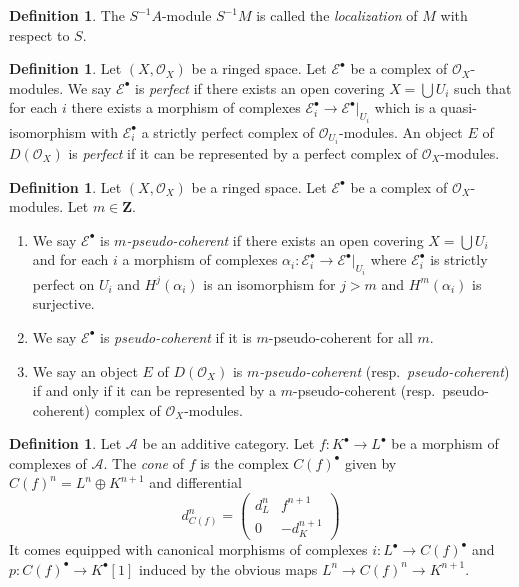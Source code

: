 \documentclass{amsart}
\theoremstyle{plain}
\theoremstyle{definition}
\newtheorem{definition}[subsection]{Definition}
\theoremstyle{remark}
\numberwithin{equation}{subsection}
\begin{document}
\begin{definition}
\label{algebra-definition-localization-module}
The $S^{-1}A$-module $S^{-1}M$ is called the {\it localization} of $M$
with respect to $S$.
\end{definition}

\begin{definition}
\label{cohomology-definition-perfect}
Let $(X, \mathcal{O}_X)$ be a ringed space.
Let $\mathcal{E}^\bullet$ be a complex of $\mathcal{O}_X$-modules.
We say $\mathcal{E}^\bullet$ is {\it perfect} if there exists
an open covering $X = \bigcup U_i$ such that for each $i$
there exists a morphism of complexes
$\mathcal{E}_i^\bullet \to \mathcal{E}^\bullet|_{U_i}$
which is a quasi-isomorphism with $\mathcal{E}_i^\bullet$
a strictly perfect complex of $\mathcal{O}_{U_i}$-modules.
An object $E$ of $D(\mathcal{O}_X)$ is {\it perfect}
if it can be represented by a perfect complex of $\mathcal{O}_X$-modules.
\end{definition}

\begin{definition}
\label{cohomology-definition-pseudo-coherent}
Let $(X, \mathcal{O}_X)$ be a ringed space. Let $\mathcal{E}^\bullet$
be a complex of $\mathcal{O}_X$-modules. Let $m \in \mathbf{Z}$.
\begin{enumerate}
\item We say $\mathcal{E}^\bullet$ is {\it $m$-pseudo-coherent}
if there exists an open covering $X = \bigcup U_i$ and for each $i$
a morphism of complexes
$\alpha_i : \mathcal{E}_i^\bullet \to \mathcal{E}^\bullet|_{U_i}$
where $\mathcal{E}_i^\bullet$ is strictly perfect on $U_i$ and
$H^j(\alpha_i)$ is an isomorphism for $j > m$ and $H^m(\alpha_i)$
is surjective.
\item We say $\mathcal{E}^\bullet$ is {\it pseudo-coherent}
if it is $m$-pseudo-coherent for all $m$.
\item We say an object $E$ of $D(\mathcal{O}_X)$ is
{\it $m$-pseudo-coherent} (resp.\ {\it pseudo-coherent})
if and only if it can be represented by a $m$-pseudo-coherent
(resp.\ pseudo-coherent) complex of $\mathcal{O}_X$-modules.
\end{enumerate}
\end{definition}

\begin{definition}
\label{derived-definition-cone}
Let $\mathcal{A}$ be an additive category.
Let $f : K^\bullet \to L^\bullet$ be a morphism of
complexes of $\mathcal{A}$. The {\it cone} of $f$
is the complex $C(f)^\bullet$ given by
$C(f)^n = L^n \oplus K^{n + 1}$ and
differential
$$
d_{C(f)}^n =
\left(
\begin{matrix}
d^n_L & f^{n + 1} \\
0 & -d_K^{n + 1}
\end{matrix}
\right)
$$
It comes equipped with canonical morphisms of complexes
$i : L^\bullet \to C(f)^\bullet$ and $p : C(f)^\bullet \to K^\bullet[1]$
induced by the obvious maps $L^n \to C(f)^n \to K^{n + 1}$.
\end{definition}
\end{document}
